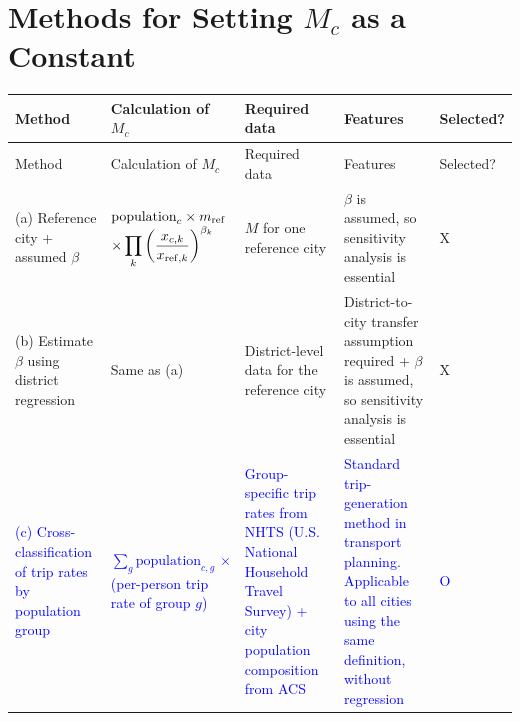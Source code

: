 \documentclass[10pt,a4paper]{article}
\begin{document}
\section{Methods for Setting $M_c$ as a Constant}
{\footnotesize
\begin{longtable}{@{}L{0.17\textwidth}L{0.27\textwidth}L{0.21\textwidth}L{0.22\textwidth}C{0.06\textwidth}@{}}
\toprule Method & Calculation of $M_c$ & Required data & Features & Selected?\\\midrule\endfirsthead
\toprule Method & Calculation of $M_c$ & Required data & Features & Selected?\\\midrule\endhead\bottomrule\endlastfoot
(a) Reference city + assumed $\beta$ & $\text{population}_c\times m_{\rm ref}$\newline $\displaystyle\times\prod_k\left(\frac{x_{c,k}}{x_{{\rm ref},k}}\right)^{\beta_k}$ & $M$ for one reference city & $\beta$ is assumed, so sensitivity analysis is essential & X\\
(b) Estimate $\beta$ using district regression & Same as (a) & District-level data for the reference city & District-to-city transfer assumption required + $\beta$ is assumed, so sensitivity analysis is essential & X\\
\textcolor{blue}{(c) Cross-classification of trip rates by population group} & \textcolor{blue}{$\displaystyle\sum_g\text{population}_{c,g}$\newline $\times$ (per-person trip rate of group $g$)} & \textcolor{blue}{Group-specific trip rates from NHTS (U.S. National Household Travel Survey) + city population composition from ACS} & \textcolor{blue}{Standard trip-generation method in transport planning. Applicable to all cities using the same definition, without regression} & \textcolor{blue}{O}\\
\end{longtable}}
\end{document}
